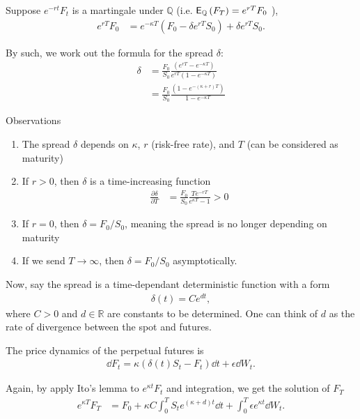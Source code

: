 \documentclass[square]{article} %
\theoremstyle{plain}
\theoremstyle{definition} %
\begin{document}
Suppose $e^{-rt} F_t$ is a martingale under $\mathbb{Q}$ (i.e. $\mathbb{\sf E}_\mathbb{Q} \left(F_T\right)= e^{rT}F_0$ ), 
\begin{align*}
  e^{r T} F_0 &= e^{-\kappa T}\left(F_0 - \delta e^{rT}S_0\right)  + \delta e^{rT}S_0.
\end{align*}

By such, we work out the formula for the spread $\delta$:
\begin{align*}
  \delta &= \frac{F_0}{S_0}\frac{\left(e^{rT}-e^{-\kappa T}\right)}{e^{rT}\left(1-e^{-\kappa T}\right)}\\
         &= \frac{F_0}{S_0}\frac{\left(1-e^{-(\kappa+r) T}\right)}{1-e^{-\kappa T}}
\end{align*}

Observations
\begin{enumerate}
\item The spread $\delta $ depends on $\kappa$, $r$ (risk-free rate), and $T$ (can be considered as maturity)
\item If $r > 0$, then $\delta$ is a time-increasing function
\begin{align*}
\frac{\partial \delta}{\partial T} &= \frac{F_0}{S_0}\frac{T e^{-r T}}{e^{\kappa T}-1}>0
\end{align*}
\item If $r=0$, then $\delta  = F_0/S_0$, meaning the spread is no longer depending on maturity
\item If we send $T\rightarrow \infty$, then $\delta = F_0/S_0$ asymptotically. 
\end{enumerate}
Now, say the spread is a time-dependant deterministic function with a form
\begin{align*}
\delta(t) = Ce^{dt},
\end{align*}
where $C>0$ and $d \in \mathbb{R}$ are constants to be determined. One can think of $d$ as the rate of divergence between the spot and futures. 

The price dynamics of the perpetual futures is 
\begin{align*}
  \dd F_t = \kappa \left(\delta(t) S_t - F_t \right)\dd t + \epsilon \dd W_t.
  \end{align*}

Again, by apply Ito's lemma to $e^{\kappa t}F_t$ and integration, we get the solution of $F_T$
\begin{align*}
e^{\kappa T}F_T & = F_0 + \kappa C \int_0^T S_t e^{(\kappa + d) t}\dd t + \int_0^T \epsilon e^{\kappa t}\dd W_t.
\end{align*}
\end{document}
